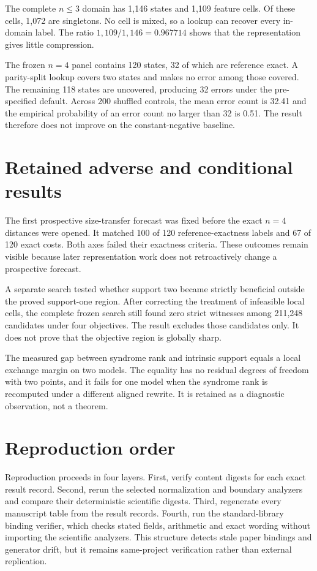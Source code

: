 \documentclass[a4paper,onecolumn,11pt,unpublished,noarxiv]{quantumarticle}
\begin{document}
The complete $n\leq3$ domain has 1,146 states and 1,109 feature cells.  Of these cells, 1,072 are singletons.  No cell is mixed, so a lookup can recover every in-domain label.  The ratio $1{,}109/1{,}146=0.967714$ shows that the representation gives little compression.

The frozen $n=4$ panel contains 120 states, 32 of which are reference exact.  A parity-split lookup covers two states and makes no error among those covered.  The remaining 118 states are uncovered, producing 32 errors under the pre-specified default.  Across 200 shuffled controls, the mean error count is 32.41 and the empirical probability of an error count no larger than 32 is 0.51.  The result therefore does not improve on the constant-negative baseline.

\StateCountsTable
\FloatBarrier

\section{Retained adverse and conditional results}

The first prospective size-transfer forecast was fixed before the exact $n=4$ distances were opened.  It matched 100 of 120 reference-exactness labels and 67 of 120 exact costs.  Both axes failed their exactness criteria.  These outcomes remain visible because later representation work does not retroactively change a prospective forecast.

A separate search tested whether support two became strictly beneficial outside the proved support-one region.  After correcting the treatment of infeasible local cells, the complete frozen search still found zero strict witnesses among 211,248 candidates under four objectives.  The result excludes those candidates only.  It does not prove that the objective region is globally sharp.

The measured gap between syndrome rank and intrinsic support equals a local exchange margin on two models.  The equality has no residual degrees of freedom with two points, and it fails for one model when the syndrome rank is recomputed under a different aligned rewrite.  It is retained as a diagnostic observation, not a theorem.

\AdverseResultsTable
\FloatBarrier

\section{Reproduction order}

Reproduction proceeds in four layers.  First, verify content digests for each exact result record.  Second, rerun the selected normalization and boundary analyzers and compare their deterministic scientific digests.  Third, regenerate every manuscript table from the result records.  Fourth, run the standard-library binding verifier, which checks stated fields, arithmetic and exact wording without importing the scientific analyzers.  This structure detects stale paper bindings and generator drift, but it remains same-project verification rather than external replication.
\end{document}
